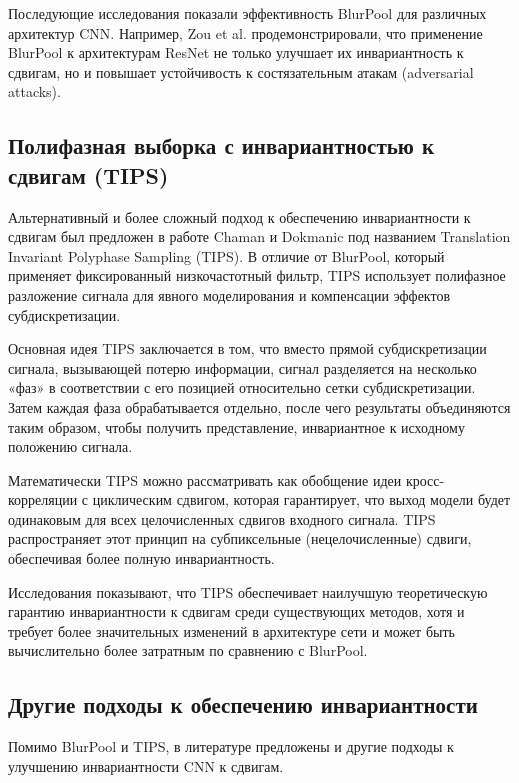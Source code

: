Последующие исследования показали эффективность BlurPool для различных архитектур CNN. Например, Zou et al. \cite{Zou2020} продемонстрировали, что применение BlurPool к архитектурам ResNet не только улучшает их инвариантность к сдвигам, но и повышает устойчивость к состязательным атакам (adversarial attacks).

\subsection{Полифазная выборка с инвариантностью к сдвигам (TIPS)}
\label{review:antialias:tips}

Альтернативный и более сложный подход к обеспечению инвариантности к сдвигам был предложен в работе Chaman и Dokmanic \cite{Chaman2021} под названием Translation Invariant Polyphase Sampling (TIPS). В отличие от BlurPool, который применяет фиксированный низкочастотный фильтр, TIPS использует полифазное разложение сигнала для явного моделирования и компенсации эффектов субдискретизации.

Основная идея TIPS заключается в том, что вместо прямой субдискретизации сигнала, вызывающей потерю информации, сигнал разделяется на несколько «фаз» в соответствии с его позицией относительно сетки субдискретизации. Затем каждая фаза обрабатывается отдельно, после чего результаты объединяются таким образом, чтобы получить представление, инвариантное к исходному положению сигнала.

Математически TIPS можно рассматривать как обобщение идеи кросс-корреляции с циклическим сдвигом, которая гарантирует, что выход модели будет одинаковым для всех целочисленных сдвигов входного сигнала. TIPS распространяет этот принцип на субпиксельные (нецелочисленные) сдвиги, обеспечивая более полную инвариантность.

Исследования показывают, что TIPS обеспечивает наилучшую теоретическую гарантию инвариантности к сдвигам среди существующих методов, хотя и требует более значительных изменений в архитектуре сети и может быть вычислительно более затратным по сравнению с BlurPool.

\subsection{Другие подходы к обеспечению инвариантности}
\label{review:antialias:other}

Помимо BlurPool и TIPS, в литературе предложены и другие подходы к улучшению инвариантности CNN к сдвигам.

